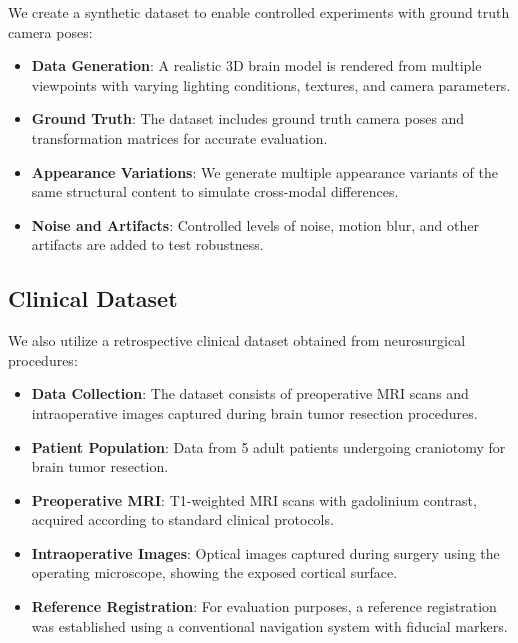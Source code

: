 We create a synthetic dataset to enable controlled experiments with ground truth camera poses:

\begin{itemize}
    \item \textbf{Data Generation}: A realistic 3D brain model is rendered from multiple viewpoints with varying lighting conditions, textures, and camera parameters.
    
    \item \textbf{Ground Truth}: The dataset includes ground truth camera poses and transformation matrices for accurate evaluation.
    
    \item \textbf{Appearance Variations}: We generate multiple appearance variants of the same structural content to simulate cross-modal differences.
    
    \item \textbf{Noise and Artifacts}: Controlled levels of noise, motion blur, and other artifacts are added to test robustness.
\end{itemize}

\subsection{Clinical Dataset}

We also utilize a retrospective clinical dataset obtained from neurosurgical procedures:

\begin{itemize}
    \item \textbf{Data Collection}: The dataset consists of preoperative MRI scans and intraoperative images captured during brain tumor resection procedures.
    
    \item \textbf{Patient Population}: Data from 5 adult patients undergoing craniotomy for brain tumor resection.
    
    \item \textbf{Preoperative MRI}: T1-weighted MRI scans with gadolinium contrast, acquired according to standard clinical protocols.
    
    \item \textbf{Intraoperative Images}: Optical images captured during surgery using the operating microscope, showing the exposed cortical surface.
    
    \item \textbf{Reference Registration}: For evaluation purposes, a reference registration was established using a conventional navigation system with fiducial markers.
\end{itemize}

